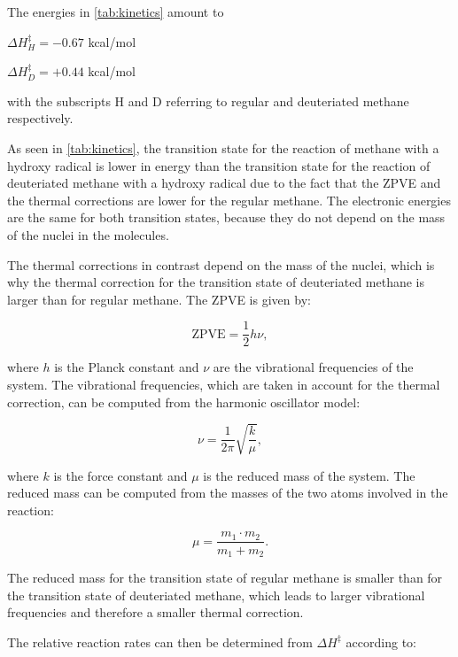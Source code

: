 \documentclass[fontsize=11pt,a4paper,oneside]{scrartcl}
\begin{document}
The energies in \autoref{tab:kinetics} amount to

\begin{center}
    $\Delta H_H^{\ddagger} = -0.67$ kcal/mol

    $\Delta H_D^{\ddagger} = +0.44$ kcal/mol
\end{center}

with the subscripts H and D referring to regular and deuteriated methane respectively.

As seen in \autoref{tab:kinetics}, the transition state for the reaction of methane with a hydroxy radical is lower in energy than the transition state for the reaction of deuteriated methane with a hydroxy radical due to the fact that the \ac{ZPVE} and the thermal corrections are lower for the regular methane. The electronic energies are the same for both transition states, because they do not depend on the mass of the nuclei in the molecules.

The thermal corrections in contrast depend on the mass of the nuclei, which is why the thermal correction for the transition state of deuteriated methane is larger than for regular methane. The \ac{ZPVE} is given by:

\begin{equation}
    \mathrm{ZPVE} = \frac{1}{2} h \nu,
\end{equation}

where $h$ is the Planck constant and $\nu$ are the vibrational frequencies of the system.  The vibrational frequencies, which are taken in account for the thermal correction, can be computed from the harmonic oscillator model:

\begin{equation}
    \nu = \frac{1}{2\pi} \sqrt{\frac{k}{\mu}},
\end{equation}

where $k$ is the force constant and $\mu$ is the reduced mass of the system. The reduced mass can be computed from the masses of the two atoms involved in the reaction:

\begin{equation}
    \mu = \frac{m_1 \cdot m_2}{m_1 + m_2}.
\end{equation}

The reduced mass for the transition state of regular methane is smaller than for the transition state of deuteriated methane, which leads to larger vibrational frequencies and therefore a smaller thermal correction.

The relative reaction rates can then be determined from $\Delta H^{\ddagger}$ according to:
\end{document}
